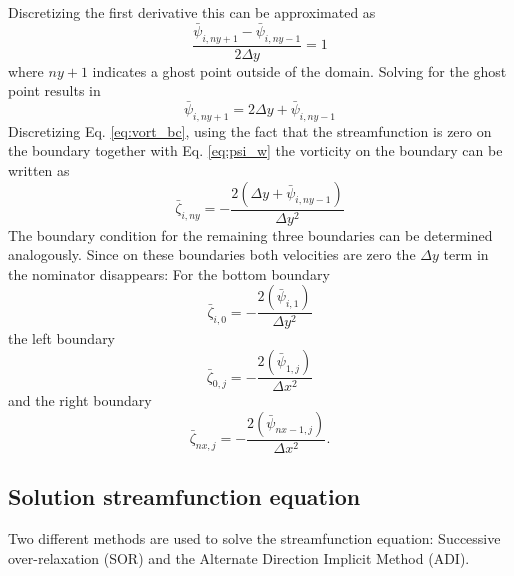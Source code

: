 Discretizing the first derivative this can be approximated as
\begin{equation}
\frac{\bar{\psi}_{i,ny+1}-\bar{\psi}_{i,ny-1}}{2 \Delta y} = 1 
\end{equation}  
where $ny+1$ indicates a ghost point outside of the domain. Solving for the ghost point results in 
\begin{equation}
\bar{\psi}_{i,ny+1} = 2 \Delta y + \bar{\psi}_{i,ny-1} 
\label{eq:psi_w}
\end{equation}
Discretizing Eq. \ref{eq:vort_bc}, using the fact that the streamfunction is zero on the boundary together with Eq. \ref{eq:psi_w} the vorticity on the boundary can be written as
\begin{equation}
\bar{\zeta}_{i,ny} = - \frac{2 (\Delta y + \bar{\psi}_{i,ny-1})}{\Delta y^2}
\end{equation}
%
The boundary condition for the remaining three boundaries can be determined analogously. Since on these boundaries both velocities are zero the $\Delta y$ term in the nominator disappears:
For the bottom boundary
\begin{equation}
\bar{\zeta}_{i,0} = - \frac{2 ( \bar{\psi}_{i,1})}{\Delta y^2}
\end{equation}
the left boundary
\begin{equation}
\bar{\zeta}_{0,j} = - \frac{2 ( \bar{\psi}_{1,j})}{\Delta x^2}
\end{equation}
and the right boundary
\begin{equation}
\bar{\zeta}_{nx,j} = - \frac{2 ( \bar{\psi}_{nx-1,j})}{\Delta x^2}.
\end{equation}
%
\subsection{Solution streamfunction equation}
Two different methods are used to solve the streamfunction equation: Successive over-relaxation (SOR) and the Alternate Direction Implicit Method (ADI). 
